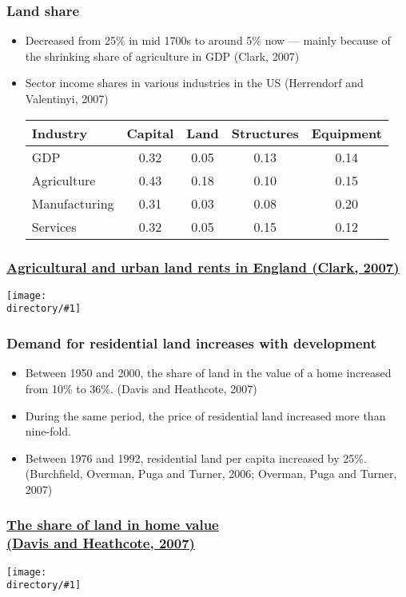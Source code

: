 \documentclass[handout,compress,mathserif]{beamer}
\newcommand{\directory}{figures}
\newcommand{\widefigure}[2]{\begin{frame}\frametitle{\hyperlink{#1back}{#2}}\hypertarget{#1}{{\begin{center}\texttt{[image: \\directory/\#1]}\end{center}}}\end{frame}}
\begin{document}
\begin{frame}\frametitle{Land share}
\begin{itemize}
\item Decreased from 25\% in mid 1700s to around 5\% now --- mainly
because of the shrinking share of agriculture in GDP (Clark, 2007)
\item Sector income shares in various industries in the US (Herrendorf and Valentinyi, 2007)
\begin{center}
\begin{tabular}{l|c|ccc}
\hline\hline
Industry    & Capital   &   Land    & Structures    & Equipment \\ \hline
GDP         &   0.32    &   0.05    & 0.13          & 0.14      \\ \hline
Agriculture & 0.43      &   0.18    & 0.10          & 0.15      \\
Manufacturing & 0.31    &   0.03    & 0.08          & 0.20      \\
Services    & 0.32      & 0.05      & 0.15          & 0.12      \\ \hline\hline
\end{tabular}
\end{center}
\end{itemize}
\end{frame}

\widefigure{clark-landrents}{Agricultural and urban land rents in England (Clark, 2007)}


\begin{frame}\frametitle{Demand for residential land increases with development}
\begin{itemize}
    \item Between 1950 and 2000, the share of land in the value of a home increased from 10\% to 36\%. (Davis and Heathcote, 2007)
    \item During the same period, the price of residential land increased more than nine-fold.
    \item Between 1976 and 1992, residential land per capita increased by 25\%.
    (Burchfield, Overman, Puga and Turner, 2006; Overman, Puga and Turner, 2007)
\end{itemize}
\end{frame}

\widefigure{dh-shares}{The share of land in home value\\ (Davis and Heathcote, 2007)}

\end{document}
